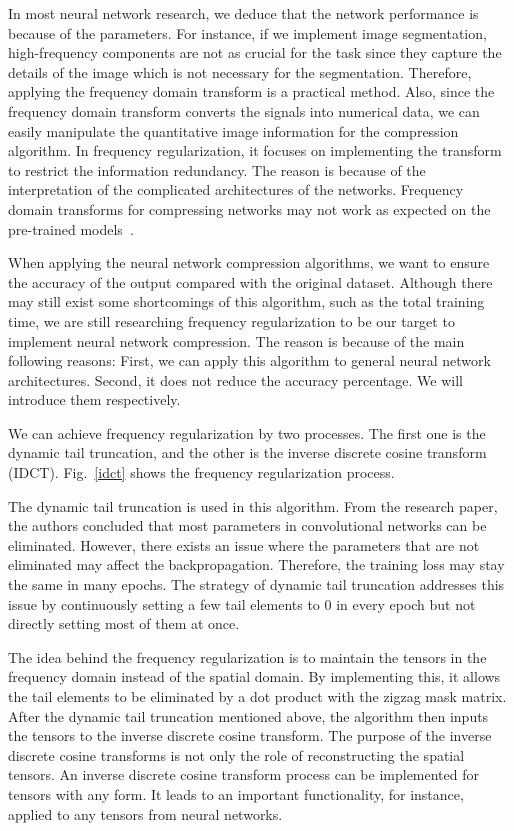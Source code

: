 \documentclass{article}
\begin{document}
In most neural network research, we deduce that the network performance is because of the parameters. For instance, if we implement image segmentation, high-frequency components are not as crucial for the task since they capture the details of the image which is not necessary for the segmentation. Therefore, applying the frequency domain transform is a practical method. Also, since the frequency domain transform converts the signals into numerical data, we can easily manipulate the quantitative image information for the compression algorithm. In frequency regularization, it focuses on implementing the transform to restrict the information redundancy. The reason is because of the interpretation of the complicated architectures of the networks. Frequency domain transforms for compressing networks may not work as expected on the pre-trained models~\cite{zhao2023frequency}. 

When applying the neural network compression algorithms, we want to ensure the accuracy of the output compared with the original dataset. Although there may still exist some shortcomings of this algorithm, such as the total training time, we are still researching frequency regularization to be our target to implement neural network compression. The reason is because of the main following reasons: First, we can apply this algorithm to general neural network architectures. Second, it does not reduce the accuracy percentage. We will introduce them respectively. 

We can achieve frequency regularization by two processes. The first one is the dynamic tail truncation, and the other is the inverse discrete cosine transform (IDCT). Fig.~\ref{idct} shows the frequency regularization process. 


The dynamic tail truncation is used in this algorithm. From the research paper, the authors concluded that most parameters in convolutional networks can be eliminated. However, there exists an issue where the parameters that are not eliminated may affect the backpropagation. Therefore, the training loss may stay the same in many epochs. The strategy of dynamic tail truncation addresses this issue by continuously setting a few tail elements to 0 in every epoch but not directly setting most of them at once.

The idea behind the frequency regularization is to maintain the tensors in the frequency domain instead of the spatial domain. By implementing this, it allows the tail elements to be eliminated by a dot product with the zigzag mask matrix. After the dynamic tail truncation mentioned above, the algorithm then inputs the tensors to the inverse discrete cosine transform. The purpose of the inverse discrete cosine transforms is not only the role of reconstructing the spatial tensors. An inverse discrete cosine transform process can be implemented for tensors with any form. It leads to an important functionality, for instance, applied to any tensors from neural networks. 



\small

% 
  
\end{document}
